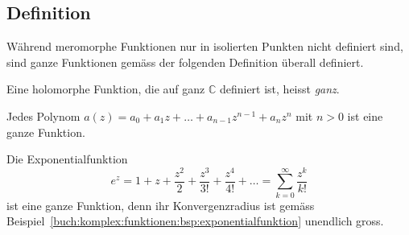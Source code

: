 %
%
%
\subsection{Definition
\label{buch:analytisch:ganz:subsection:definition}}
Während meromorphe Funktionen nur in isolierten Punkten nicht definiert
sind, sind ganze Funktionen gemäss der folgenden Definition überall
definiert.

\begin{definition}
Eine holomorphe Funktion, die auf ganz $\mathbb{C}$ definiert ist,
heisst \emph{ganz}.
%
\end{definition}

\begin{beispiel}
Jedes Polynom $a(z) = a_0 + a_1z + \ldots + a_{n-1}z^{n-1} + a_nz^n$ 
mit $n>0$ ist eine ganze Funktion.
\end{beispiel}

\begin{beispiel}
Die Exponentialfunktion
\[
e^z
=
1
+
z
+
\frac{z^2}{2}
+
\frac{z^3}{3!}
+
\frac{z^4}{4!}
+
\ldots
=
\sum_{k=0}^\infty \frac{z^k}{k!}
\]
ist eine ganze Funktion, denn ihr Konvergenzradius ist gemäss
Beispiel~\ref{buch:komplex:funktionen:bsp:exponentialfunktion}
unendlich gross.
\end{beispiel}

